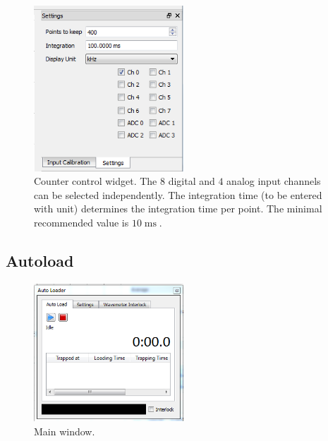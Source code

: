 \documentclass[11pt]{scrartcl}
\newcommand{\unit}[1]{\ensuremath{\operatorname{#1}}}
\begin{document}
\begin{figure}
\centering
\includegraphics[width=0.5\textwidth]{DedicatedCountersSettings}
\caption{\label{DedicatedCountersSettings} Counter control widget. The $8$ digital and $4$ analog input channels can be selected independently. The integration time (to be entered with unit) determines the integration time per point. The minimal recommended value is $10\unit{ms}$. }
\end{figure}



\subsection{Autoload}
\begin{figure}[htbp]
\begin{center}
\includegraphics[width=0.5\textwidth]{Autoload}
\end{center}
\caption{\label{Autoload} Main window.}
\end{figure}
\end{document}
